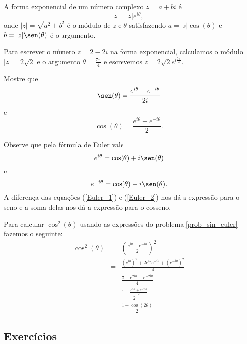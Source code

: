 \begin{defn}A forma exponencial de um número complexo $z=a+bi$ é 
\begin{equation}
z=|z|e^{i\theta},
\end{equation}
onde $|z|=\sqrt{a^2+b^2}$ é o módulo de $z$ e $\theta$ satisfazendo $a=|z|\cos(\theta)$ e $b=|z|\sen(\theta)$ é o argumento.
\end{defn}
\begin{ex}Para escrever o número $z=2-2i$ na forma exponencial, calculamos o módulo $|z|=2\sqrt{2}$ e o argumento $\theta=\frac{7\pi}{4}$ e escrevemos $z=2\sqrt{2}e^{i\frac{7\pi}{4}}$. 
\end{ex}
\begin{ex}{\label{prob_sin_euler}}Mostre que
\begin{equation}
\sen(\theta)=\frac{e^{i\theta}-e^{-i\theta}}{2i}
\end{equation}
e
\begin{equation}
\cos(\theta)=\frac{e^{i\theta}+e^{-i\theta}}{2}.
\end{equation}

Observe que pela fórmula de Euler vale
\begin{equation}{\label{Euler_1}}
e^{i\theta}=\cos(\theta)+i\sen(\theta)
\end{equation}
e
\begin{equation}{\label{Euler_2}}
e^{-i\theta}=\cos(\theta)-i\sen(\theta).
\end{equation}
A diferença das equações (\ref{Euler_1}) e (\ref{Euler_2}) nos dá a expressão para o seno e a soma delas nos dá a expressão para o cosseno.
\end{ex}
\begin{ex}Para calcular $\cos^2(\theta)$ usando as expressões do problema \ref{prob_sin_euler} fazemos o seguinte:
\begin{eqnarray*}
\cos^2(\theta)&=&\left(\frac{e^{i\theta}+e^{-i\theta}}{2}\right)^2\\
&=&\frac{\left(e^{i\theta}\right)^2+2e^{i\theta}e^{-i\theta}+\left(e^{-i\theta}\right)^2}{4}\\
&=&\frac{2+e^{2i\theta}+e^{-2i\theta}}{4}\\
&=&\frac{1+\frac{e^{2i\theta}+e^{-2i\theta}}{2}}{2}\\
&=&\frac{1+\cos(2\theta)}{2}
\end{eqnarray*}
\end{ex}
\subsection*{Exercícios}

